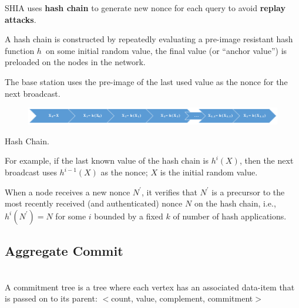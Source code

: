 \documentclass[%
  slidesonly,%
  semlayer%
  ]{seminar}                                  %
\newenvironment{defn}{\noindent \\ \noindent{\bf Defn:}}{\hspace*{\fill} \newline}
\begin{document}
\begin{slide}
      SHIA uses \textbf{hash chain} to generate new nonce for each query to avoid \textbf{replay attacks}.
      
      A hash chain is constructed by repeatedly evaluating a pre-image resistant hash function $h$\ on some initial random value, the final value (or ``anchor value'') is preloaded on the nodes in the network.
      
      The base station uses the pre-image of the last used value as the nonce for the next broadcast.
      
      \begin{figure}[h!]
        \centering
        \includegraphics[scale=0.35]{images/hash-chain.png}
        \label{fig:hash-chain}
      \end{figure}
      \begin{center}
        Hash Chain.
      \end{center}

      For example, if the last known value of the hash chain is $h^i(X)$, then the next broadcast uses $h^{i-1}(X)$ as the nonce; $X$ is the initial random value.
      
      When a node receives a new nonce $N^{'}$, it verifies that $N^{'}$ is a precursor to the most recently received (and authenticated) nonce $N$ on the hash chain, i.e., $h^{i}(N^{'}) = N$ for some $i$ bounded by a fixed $k$ of number of hash applications.  
      \vfill
      \clearpage

    \subsection*{Aggregate Commit}
      \begin{defn}
        A commitment tree is a tree where each vertex has an associated data-item that is passed on to its parent: 
        $<$count, value, complement, commitment$>$
      \end{defn}


\end{slide}
\end{document}
